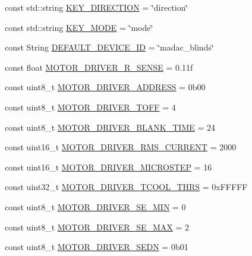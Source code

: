 \begin{DoxyCompactItemize}
\item 
const std\+::string \hyperlink{namespaceCONFIG__SET_a01f506112394a3ac18b3a731a710984c}{K\+E\+Y\+\_\+\+D\+I\+R\+E\+C\+T\+I\+ON} = \char`\"{}direction\char`\"{}
\item 
const std\+::string \hyperlink{namespaceCONFIG__SET_a77febd18d2a2712e1357b057a52e9be3}{K\+E\+Y\+\_\+\+M\+O\+DE} = \char`\"{}mode\char`\"{}
\item 
const String \hyperlink{namespaceCONFIG__SET_a2ac88bd64607d4819d1bda478f469817}{D\+E\+F\+A\+U\+L\+T\+\_\+\+D\+E\+V\+I\+C\+E\+\_\+\+ID} = \char`\"{}madac\+\_\+blinds\char`\"{}
\item 
const float \hyperlink{namespaceCONFIG__SET_a8f23ef59b087dff79c434bd84525a915}{M\+O\+T\+O\+R\+\_\+\+D\+R\+I\+V\+E\+R\+\_\+\+R\+\_\+\+S\+E\+N\+SE} = 0.\+11f
\item 
const uint8\+\_\+t \hyperlink{namespaceCONFIG__SET_a6a76f57577e628d797a633669d8adced}{M\+O\+T\+O\+R\+\_\+\+D\+R\+I\+V\+E\+R\+\_\+\+A\+D\+D\+R\+E\+SS} = 0b00
\item 
const uint8\+\_\+t \hyperlink{namespaceCONFIG__SET_a9cd2f24701a5f7debb61387d734af3f7}{M\+O\+T\+O\+R\+\_\+\+D\+R\+I\+V\+E\+R\+\_\+\+T\+O\+FF} = 4
\item 
const uint8\+\_\+t \hyperlink{namespaceCONFIG__SET_abd06bbb93246b7d98d1e7c2e5e4954b4}{M\+O\+T\+O\+R\+\_\+\+D\+R\+I\+V\+E\+R\+\_\+\+B\+L\+A\+N\+K\+\_\+\+T\+I\+ME} = 24
\item 
const uint16\+\_\+t \hyperlink{namespaceCONFIG__SET_a367788b61bc20c95602dec7063093fce}{M\+O\+T\+O\+R\+\_\+\+D\+R\+I\+V\+E\+R\+\_\+\+R\+M\+S\+\_\+\+C\+U\+R\+R\+E\+NT} = 2000
\item 
const uint16\+\_\+t \hyperlink{namespaceCONFIG__SET_a7028034ed96d5ef10a87d1cdc12c5d27}{M\+O\+T\+O\+R\+\_\+\+D\+R\+I\+V\+E\+R\+\_\+\+M\+I\+C\+R\+O\+S\+T\+EP} = 16
\item 
const uint32\+\_\+t \hyperlink{namespaceCONFIG__SET_aaaf7add03a2bd7b4a1cad95838dc6545}{M\+O\+T\+O\+R\+\_\+\+D\+R\+I\+V\+E\+R\+\_\+\+T\+C\+O\+O\+L\+\_\+\+T\+H\+RS} = 0x\+F\+F\+F\+FF
\item 
const uint8\+\_\+t \hyperlink{namespaceCONFIG__SET_a32dc4d5c8cc5890bf7f9be0a7f15bdb2}{M\+O\+T\+O\+R\+\_\+\+D\+R\+I\+V\+E\+R\+\_\+\+S\+E\+\_\+\+M\+IN} = 0
\item 
const uint8\+\_\+t \hyperlink{namespaceCONFIG__SET_a790b63a59051c9e242aff5b4123a9ca5}{M\+O\+T\+O\+R\+\_\+\+D\+R\+I\+V\+E\+R\+\_\+\+S\+E\+\_\+\+M\+AX} = 2
\item 
const uint8\+\_\+t \hyperlink{namespaceCONFIG__SET_a957a048d0f02b3bca4145248c6d79c77}{M\+O\+T\+O\+R\+\_\+\+D\+R\+I\+V\+E\+R\+\_\+\+S\+E\+DN} = 0b01

\end{DoxyCompactItemize}
